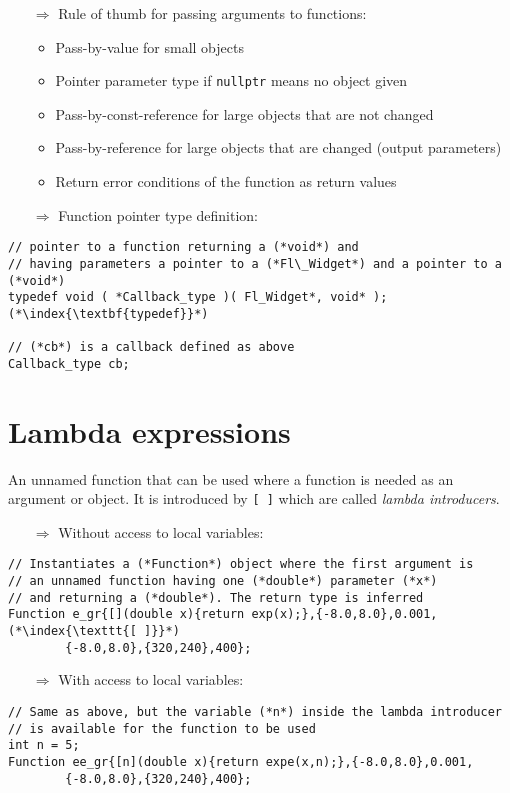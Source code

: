 \documentclass[10pt]{article}
\begin{document}
\begin{enumerate}
\item[$\Rightarrow$] Rule of thumb for passing arguments to functions:
\begin{itemize}
\item Pass-by-value for small objects
\item Pointer parameter type if \texttt{nullptr} means no object given
\item Pass-by-const-reference for large objects that are not changed
\item Pass-by-reference for large objects that are changed (output parameters)
\item Return error conditions of the function as return values
\end{itemize}
\end{enumerate}
\begin{enumerate}
\item[$\Rightarrow$] Function pointer type definition:
\end{enumerate}
\begin{lstlisting}
// pointer to a function returning a (*void*) and
// having parameters a pointer to a (*Fl\_Widget*) and a pointer to a (*void*)
typedef void ( *Callback_type )( Fl_Widget*, void* ); (*\index{\textbf{typedef}}*)

// (*cb*) is a callback defined as above
Callback_type cb;
\end{lstlisting}
%
%
\section{Lambda expressions}
\small
An unnamed function that can be used where a function is needed as an argument or object.
It is introduced by \texttt{[ ]} which are called \emph{lambda introducers}.
\begin{enumerate}
\item[$\Rightarrow$] Without access to local variables:
\end{enumerate}
\begin{lstlisting}
// Instantiates a (*Function*) object where the first argument is
// an unnamed function having one (*double*) parameter (*x*)
// and returning a (*double*). The return type is inferred
Function e_gr{[](double x){return exp(x);},{-8.0,8.0},0.001,(*\index{\texttt{[ ]}}*)
        {-8.0,8.0},{320,240},400};
\end{lstlisting}
\begin{enumerate}
\item[$\Rightarrow$] With access to local variables:
\end{enumerate}
\begin{lstlisting}
// Same as above, but the variable (*n*) inside the lambda introducer
// is available for the function to be used
int n = 5;
Function ee_gr{[n](double x){return expe(x,n);},{-8.0,8.0},0.001,
        {-8.0,8.0},{320,240},400};
 \end{lstlisting}
%
%
\end{document}
